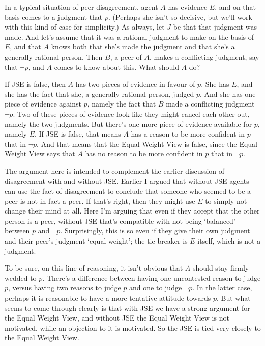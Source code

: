 In a typical situation of peer disagreement, agent \(A\) has evidence \(E\), and on that basis comes to a judgment that \(p\). (Perhaps she isn't so decisive, but we'll work with this kind of case for simplicity.) As always, let \(J\) be that that judgment was made. And let's assume that it was a rational judgment to make on the basis of \(E\), and that \(A\) knows both that she's made the judgment and that she's a generally rational person. Then \(B\), a peer of \(A\), makes a conflicting judgment, say that \(\neg p\), and \(A\) comes to know about this. What should \(A\) do?

If JSE is false, then \(A\) has two pieces of evidence in favour of \(p\). She has \(E\), and she has the fact that she, a generally rational person, judged \(p\). And she has one piece of evidence against \(p\), namely the fact that \(B\) made a conflicting judgment \(\neg p\). Two of these pieces of evidence look like they might cancel each other out, namely the two judgments. But there's one more piece of evidence available for \(p\), namely \(E\). If JSE is false, that means \(A\) has a reason to be more confident in \(p\) that in \(\neg p\). And that means that the Equal Weight View is false, since the Equal Weight View says that \(A\) has no reason to be more confident in \(p\) that in \(\neg p\).

The argument here is intended to complement the earlier discussion of disagreement with and without JSE. Earlier I argued that without JSE agents can use the fact of disagreement to conclude that someone who seemed to be a peer is not in fact a peer. If that's right, then they might use \(E\) to simply not change their mind at all. Here I'm arguing that even if they accept that the other person is a peer, without JSE that's compatible with not being `balanced' between \(p\) and \(\neg p\). Surprisingly, this is so even if they give their own judgment and their peer's judgment `equal weight'; the tie-breaker is \(E\) itself, which is not a judgment.

To be sure, on this line of reasoning, it isn't obvious that \(A\) should stay firmly wedded to \(p\). There's a difference between having one uncontested reason to judge \(p\), versus having two reasons to judge \(p\) and one to judge \(\neg p\). In the latter case, perhaps it is reasonable to have a more tentative attitude towards \(p\). But what seems to come through clearly is that with JSE we have a strong argument for the Equal Weight View, and without JSE the Equal Weight View is not motivated, while an objection to it is motivated. So the JSE is tied very closely to the Equal Weight View.

